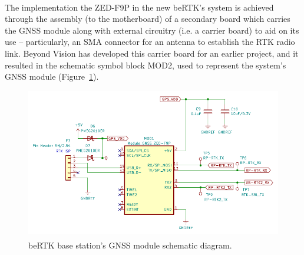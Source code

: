 The implementation the ZED-F9P in the new beRTK\textsuperscript{\textregistered}'s system is achieved through the assembly (to the motherboard) of a secondary board which carries the GNSS module along with external circuitry (i.e. a carrier board) to aid on its use -- particularly, an SMA connector for an antenna to establish the RTK radio link. Beyond Vision has developed this carrier board for an earlier project, and it resulted in the schematic symbol block MOD2, used to represent the system's GNSS module (Figure~\ref{fig:ZEDF9P_circuit}).

\begin{figure}[h]
	\centering
	\includegraphics[width=1.0\textwidth]{Chapters/Figures/chapter3/Modules_ZEDF9P.pdf}
	\caption{beRTK\textsuperscript{\textregistered} base station's GNSS module schematic diagram.}
	\label{fig:ZEDF9P_circuit}
\end{figure}

